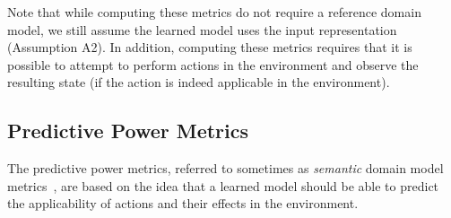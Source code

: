 \documentclass{article}
\theoremstyle{definition}
\theoremstyle{remark}
\newif\ifaddcomments
\newcommand{\roni}[1]{\ifaddcomments{\textcolor{red}{[Roni: #1]}}\fi}
\begin{document}
Note that while computing these metrics do not require a reference domain model, we still assume the learned model uses the input representation (Assumption A2).  
In addition, computing these metrics requires that it is possible to attempt to perform actions in the environment and observe the resulting state (if the action is indeed applicable in the environment). 









\subsection{Predictive Power Metrics}
\label{sec:predictiveness-metrics}
The predictive power metrics, referred to sometimes as \emph{semantic} domain model metrics~\citep{aineto2019learning,mordoch2024safe,le2024learning}, are based on the idea that a learned model should be able to predict the applicability of actions and their effects in the environment. 
\end{document}
